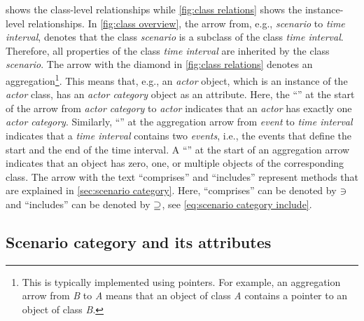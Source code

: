 \cstartd {} shows the class-level relationships while \cref{fig:class relations} shows the instance-level relationships.
In \cref{fig:class overview}, the arrow from, e.g., \textit{scenario} to \textit{time interval}, denotes that the class \textit{scenario} is a subclass of the class \textit{time interval}. Therefore, all properties of the class \textit{time interval} are inherited by the class \textit{scenario}. 
The arrow with the diamond in \cref{fig:class relations} denotes an aggregation\footnote{This is typically implemented using pointers. For example, an aggregation arrow from \textit{B} to \textit{A} means that an object of class \textit{A} contains a pointer to an object of class \textit{B}.}.
This means that, e.g., an \textit{actor} object, which is an instance of the \textit{actor} class, has an \textit{actor category} object as an attribute. \cendd
Here, the ``\hasone'' at the start of the arrow from \textit{actor category} to \textit{actor} indicates that an \textit{actor} has \cstartd exactly \cendd one \textit{actor category}.
\cstartb Similarly, ``\hastwo'' at the aggregation arrow from \textit{event} to \textit{time interval} indicates that a \textit{time interval} contains two \textit{events}, i.e., the events that define the start and the end of the time interval. \cendb 
A ``\hasn'' at the start of an aggregation arrow indicates that an object has zero, one, or multiple objects of the corresponding class.
The arrow with the text ``comprises'' and ``includes'' represent methods that are explained in \cref{sec:scenario category}. Here, ``comprises'' can be denoted by $\ni$ and ``includes'' can be denoted by $\supseteq$, see \cref{eq:scenario category include}. 

\begin{figure*}[t]
	\centering
	
	\caption{Schematic overview of most classes of our object-oriented framework.}
	\label{fig:class overview}
\end{figure*}

\begin{figure*}[t]
	\centering
	
	\caption{Schematic overview of the relation between the classes for representing the scenarios for the assessment of automated vehicles.}
	\label{fig:class relations}
\end{figure*}



\subsection{Scenario category and its attributes}
\label{sec:domain scenario category}

